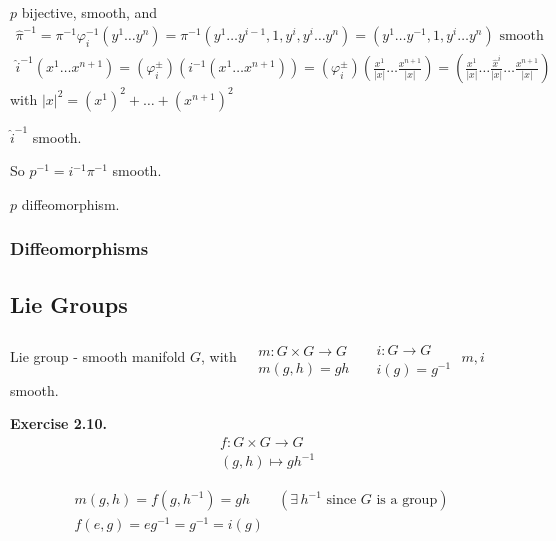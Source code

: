 \documentclass[11pt]{amsart}
\theoremstyle{definition}
\newcommand{\exercisehead}[1]{\medskip\noindent\textbf{Exercise #1.} }
\begin{document}
\begin{enumerate}
$p$ bijective, smooth, and
\[
\begin{gathered}
  \widehat{\pi}^{-1} = \pi^{-1}\varphi_i^{-1}(y^1 \dots y^n) = \pi^{-1}(y^1 \dots y^{i-1}, 1, y^i, y^i \dots y^n ) = (y^1 \dots y^{-1}, 1, y^i \dots y^n) \text{ smooth } \\
 \widehat{i}^{-1}(x^1 \dots x^{n+1}) = (\varphi_i^{\pm})(i^{-1}(x^1 \dots x^{n+1} ) ) = (\varphi_i^{\pm})\left( \frac{x^1}{ |x|} \dots \frac{x^{n+1}}{ |x|} \right) = \left( \frac{x^1}{ |x|} \dots \frac{ \widehat{ x}^i}{ |x|} \dots \frac{x^{n+1}}{ |x|} \right)
\end{gathered}
\]
with $|x|^2 = (x^1)^2 + \dots + (x^{n+1})^2$

$\widehat{i}^{-1}$ smooth.

So $p^{-1} = i^{-1} \pi^{-1}$ smooth.

$p$ diffeomorphism.

\end{enumerate}

\subsubsection*{ Diffeomorphisms }

\subsection*{ Lie Groups }

Lie group - smooth manifold $G$, with $\begin{aligned} & \quad \\
  & m : G \times G \to G \\
  & m(g,h) = gh \end{aligned}$ \quad \quad $\begin{aligned} & \quad \\
  & i : G \to G \\
  & i(g) = g^{-1} \end{aligned}$ \quad \quad $m,i$ smooth.

\exercisehead{2.10}
\[
\begin{aligned}
  & f:G\times G \to G \\
  & (g,h) \mapsto gh^{-1}
\end{aligned}
\]

\[
\begin{gathered}
  m(g,h) = f(g,h^{-1}) = gh \quad \quad (\exists \, h^{-1} \text{ since } G \text{ is a group}) \\
  f(e,g) = eg^{-1} = g^{-1} = i(g)
\end{gathered}
\]
\end{document}
